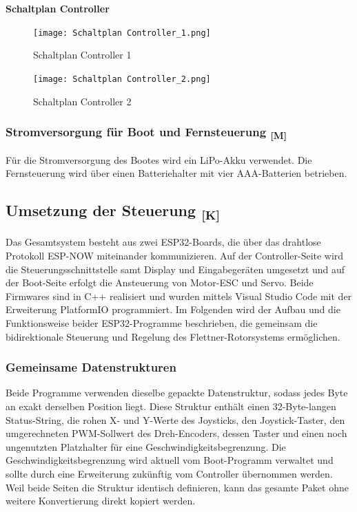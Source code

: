 \documentclass[a4paper,12pt]{article}
\begin{document}
\newpage
\textbf{Schaltplan Controller}

\begin{figure}[H]
    \centering
    \texttt{[image: Schaltplan Controller\_1.png]}
    \caption{Schaltplan Controller 1}
    \label{fig:Schaltplan Controller 1}
\end{figure}

\begin{figure}[H]
    \centering
    \texttt{[image: Schaltplan Controller\_2.png]}
    \caption{Schaltplan Controller 2}
    \label{fig:Schaltplan Controller 2}
\end{figure}

\subsubsection{\texorpdfstring{Stromversorgung für Boot und Fernsteuerung \textsubscript{[M]}}{Stromversorgung für Boot und Fernsteuerung [M]}}

Für die Stromversorgung des Bootes wird ein LiPo-Akku verwendet. Die Fernsteuerung wird über einen Batteriehalter mit vier AAA-Batterien betrieben.\cite{LiPo_Akku}\cite{Batterie_Halter}

\newpage

\subsection{\texorpdfstring{Umsetzung der Steuerung \textsubscript{[K]}}{Umsetzung der Steuerung [K]}}
\label{sec:Umsetzund der Steuerung}

Das Gesamtsystem besteht aus zwei ESP32-Boards, die über das drahtlose Protokoll ESP-NOW miteinander kommunizieren. Auf der Controller-Seite wird die Steuerungsschnittstelle samt Display und Eingabegeräten umgesetzt und auf der Boot-Seite erfolgt die Ansteuerung von Motor-ESC und Servo. Beide Firmwares sind in C++ realisiert und wurden mittels Visual Studio Code mit der Erweiterung PlatformIO programmiert. Im Folgenden wird der Aufbau und die Funktionsweise beider ESP32-Programme beschrieben, die gemeinsam die bidirektionale Steuerung und Regelung des Flettner-Rotorsystems ermöglichen. 


\subsubsection{Gemeinsame Datenstrukturen}
\label{sec:Gemeinsame Datenstrukturen}

Beide Programme verwenden dieselbe gepackte Datenstruktur, sodass jedes Byte an exakt derselben Position liegt. Diese Struktur enthält einen 32-Byte-langen Status-String, die rohen X- und Y-Werte des Joysticks, den Joystick-Taster, den umgerechneten PWM-Sollwert des Dreh-Encoders, dessen Taster und einen noch ungenutzten Platzhalter für eine Geschwindigkeitsbegrenzung. Die Geschwindigkeitsbegrenzung wird aktuell vom Boot-Programm verwaltet und sollte durch eine Erweiterung zukünftig vom Controller übernommen werden. Weil beide Seiten die Struktur identisch definieren, kann das gesamte Paket ohne weitere Konvertierung direkt kopiert werden.
\end{document}
